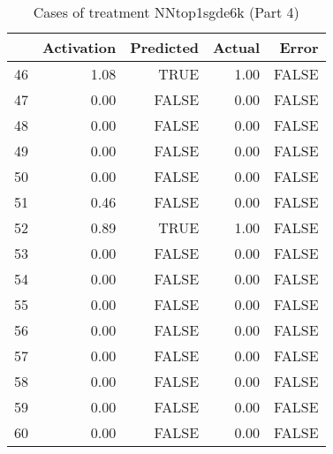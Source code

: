 \begin{table}[ht]
\centering
\begin{tabular}{rrrrr}
  \hline
 & Activation & Predicted & Actual & Error \\ 
  \hline
46 & 1.08 & TRUE & 1.00 & FALSE \\ 
  47 & 0.00 & FALSE & 0.00 & FALSE \\ 
  48 & 0.00 & FALSE & 0.00 & FALSE \\ 
  49 & 0.00 & FALSE & 0.00 & FALSE \\ 
  50 & 0.00 & FALSE & 0.00 & FALSE \\ 
  51 & 0.46 & FALSE & 0.00 & FALSE \\ 
  52 & 0.89 & TRUE & 1.00 & FALSE \\ 
  53 & 0.00 & FALSE & 0.00 & FALSE \\ 
  54 & 0.00 & FALSE & 0.00 & FALSE \\ 
  55 & 0.00 & FALSE & 0.00 & FALSE \\ 
  56 & 0.00 & FALSE & 0.00 & FALSE \\ 
  57 & 0.00 & FALSE & 0.00 & FALSE \\ 
  58 & 0.00 & FALSE & 0.00 & FALSE \\ 
  59 & 0.00 & FALSE & 0.00 & FALSE \\ 
  60 & 0.00 & FALSE & 0.00 & FALSE \\ 
   \hline
\end{tabular}
\caption{Cases of treatment NNtop1sgde6k (Part 4)} 
\end{table}
